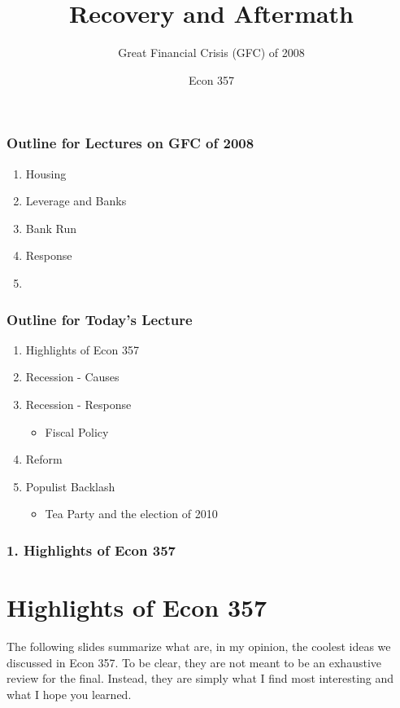 \documentclass{beamer}
\title{Recovery and Aftermath}
\subtitle{Great Financial Crisis (GFC) of 2008}
\author{Econ 357}
\date{\week}
\begin{document}
\frame{\titlepage}

\begin{frame}
    \frametitle{Outline for Lectures on GFC of 2008}

    \begin{enumerate}
        \item Housing
        \item Leverage and Banks
        \item Bank Run
        \item Response
        \item {}
    \end{enumerate}
    \vspace{1em}

\end{frame}

\begin{frame}
    \frametitle{Outline for Today's Lecture}
    
\begin{enumerate}
    \item Highlights of Econ 357
    \item Recession - Causes
    \item Recession - Response
    \begin{itemize}
        \item Fiscal Policy
    \end{itemize}
    \item Reform
    \item Populist Backlash
    \begin{itemize}
        \item Tea Party and the election of 2010
    \end{itemize}
\end{enumerate}

\end{frame}

\begin{frame}
    \frametitle{1. Highlights of Econ 357}
    \section{Highlights of Econ 357}

    The following slides summarize what are, in my opinion, the coolest ideas we discussed in Econ 357.   To be clear, they are not meant to be an exhaustive review for the final.   Instead, they are simply what I find most interesting and what I hope you learned.

\end{frame}
\end{document}

